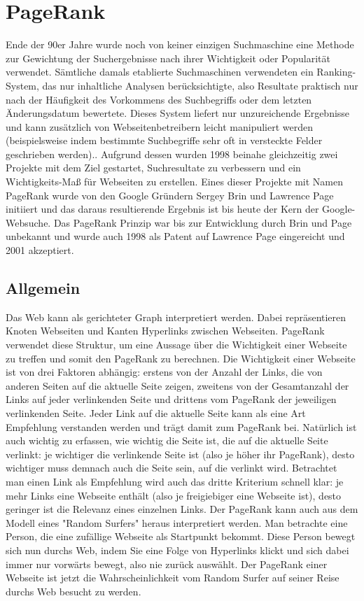 \documentclass[12pt, a4paper]{llncs}
\begin{document}
	\section{PageRank}
	Ende der 90er Jahre wurde noch von keiner einzigen Suchmaschine eine Methode zur Gewichtung der Suchergebnisse nach ihrer Wichtigkeit oder Popularität verwendet.
	Sämtliche damals etablierte Suchmaschinen verwendeten ein Ranking-System, das nur inhaltliche Analysen berücksichtigte, also Resultate praktisch nur nach der Häufigkeit
	des Vorkommens des Suchbegriffs oder dem letzten Änderungsdatum bewertete. Dieses System liefert nur unzureichende Ergebnisse und kann zusätzlich von Webseitenbetreibern 
	leicht manipuliert werden (beispielsweise indem bestimmte Suchbegriffe sehr oft in versteckte Felder geschrieben werden).\cite{wills06}.
	Aufgrund dessen wurden 1998 beinahe gleichzeitig zwei Projekte mit dem Ziel	gestartet, Suchresultate zu verbessern und ein Wichtigkeits-Maß für Webseiten zu erstellen.
	Eines dieser Projekte mit Namen PageRank wurde von den Google Gründern Sergey Brin und Lawrence Page initiiert und das daraus resultierende Ergebnis ist bis heute
	der Kern der Google-Websuche\cite{langville11}.
	Das PageRank Prinzip war bis zur Entwicklung durch Brin und Page unbekannt und wurde auch 1998 als Patent auf Lawrence Page eingereicht und 2001 akzeptiert\cite{google98}.

	\subsection{Allgemein}
	Das Web kann als gerichteter Graph interpretiert werden. Dabei repräsentieren Knoten Webseiten und Kanten Hyperlinks zwischen Webseiten. PageRank verwendet
	diese Struktur, um eine Aussage über die Wichtigkeit einer Webseite zu treffen und somit den PageRank zu berechnen. Die Wichtigkeit einer Webseite ist von drei
	Faktoren abhängig: erstens von der Anzahl der Links, die von anderen Seiten auf die aktuelle Seite zeigen, zweitens von der Gesamtanzahl der Links auf jeder
	verlinkenden Seite und drittens vom PageRank der jeweiligen verlinkenden Seite. Jeder Link auf die aktuelle Seite kann als eine Art Empfehlung verstanden werden
	und trägt damit zum PageRank bei. Natürlich ist auch wichtig zu erfassen, wie wichtig die Seite ist, die auf die aktuelle Seite verlinkt: je wichtiger die
	verlinkende Seite ist (also je höher ihr PageRank), desto wichtiger muss demnach auch die Seite sein, auf die verlinkt wird. Betrachtet man einen Link als
	Empfehlung wird auch das dritte Kriterium schnell klar: je mehr Links eine Webseite enthält (also je freigiebiger eine Webseite ist), desto geringer ist die
	Relevanz eines einzelnen Links\cite{langville11}.
	Der PageRank kann auch aus dem Modell eines "Random Surfers" heraus interpretiert werden. Man betrachte eine Person, die eine zufällige Webseite als Startpunkt
	bekommt. Diese Person bewegt sich nun durchs Web, indem Sie eine Folge von Hyperlinks klickt und sich dabei immer nur vorwärts bewegt, also nie zurück auswählt.
	Der PageRank einer Webseite ist jetzt die Wahrscheinlichkeit vom Random Surfer auf seiner Reise durchs Web besucht zu werden\cite{page98}.
	
\end{document}
